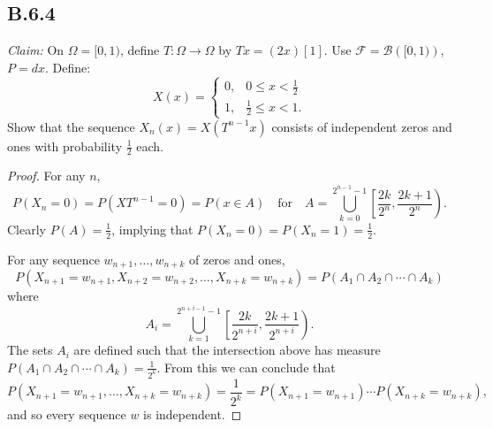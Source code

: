 \documentclass[10pt]{article}
\begin{document}
\subsection*{B.6.4}
\textit{Claim:}
On $\Omega = [0,1)$, define $T: \Omega \to \Omega$ by $Tx = (2x)[1]$.
Use $\mathcal{F} = \mathcal{B}\left( [0,1) \right)$, $P=dx$. Define:
\begin{equation*}
  X(x) = \begin{cases}
    0, & 0 \le x < \frac{1}{2} \\ 1, & \frac{1}{2} \le x < 1.
  \end{cases}
\end{equation*}
Show that the sequence $X_n(x) = X(T^{n-1}x)$ consists of independent
zeros and ones with probability $\frac{1}{2}$ each.
\begin{proof}
  For any $n$,
  \begin{equation*}
    P(X_n = 0) = P(XT^{n-1} = 0) = P(x \in A) 
    \quad \text{for} \quad
    A = \bigcup_{k=0}^{2^{n-1}-1} \left[\frac{2k}{2^{n}}, 
      \frac{2k+1}{2^{n}}\right).
  \end{equation*}
  Clearly $P(A) = \frac{1}{2}$, 
  implying that $P(X_n = 0) = P(X_n = 1) = \frac{1}{2}$.

  For any sequence $w_{n+1}, \dots, w_{n+k}$ 
  of zeros and ones,
  \begin{equation*}
    P(X_{n+1}=w_{n+1}, X_{n+2}=w_{n+2}, \dots, X_{n+k}=w_{n+k})
    = P(A_1 \cap A_2 \cap \cdots \cap A_k)
  \end{equation*}
  where
  \begin{equation*}
    A_i = \bigcup_{k=1}^{2^{n+i-1}-1} \left[\frac{2k}{2^{n+i}}, 
      \frac{2k+1}{2^{n+i}}\right).
  \end{equation*}
  The sets $A_i$ are defined such that the intersection above has measure 
  $P(A_1 \cap A_2 \cap \cdots \cap A_k) = \frac{1}{2^{k}}$.
  From this we can conclude that
  \begin{equation*}
    P(X_{n+1}=w_{n+1}, \dots, X_{n+k}=w_{n+k})
    = \frac{1}{2^k}
    = P(X_{n+1}=w_{n+1}) \cdots P(X_{n+k}=w_{n+k}),
  \end{equation*}
  and so every sequence $w$ is independent.
\end{proof}

\end{document}
